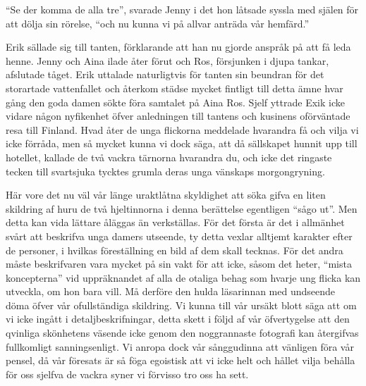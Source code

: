 ``Se der komma de alla tre'', svarade Jenny i det hon låtsade syssla med
själen för att dölja sin rörelse, ``och nu kunna vi på allvar anträda
vår hemfärd.''

Erik sällade sig till tanten, förklarande att han nu gjorde anspråk på
att få leda henne. Jenny och Aina ilade åter förut och Ros, försjunken i
djupa tankar, afslutade tåget. Erik uttalade naturligtvis för tanten sin
beundran för det storartade vattenfallet och återkom städse mycket
fintligt till detta ämne hvar gång den goda damen sökte föra samtalet på
Aina Ros. Sjelf yttrade Exik icke vidare någon nyfikenhet öfver
anledningen till tantens och kusinens oförväntade resa till Finland.
Hvad åter de unga flickorna meddelade hvarandra få och vilja vi icke
förråda, men så mycket kunna vi dock säga, att då sällskapet hunnit upp
till hotellet, kallade de två vackra tärnorna hvarandra du, och icke det
ringaste tecken till svartsjuka tycktes grumla deras unga vänskaps
morgongryning.

Här vore det nu väl vår länge uraktlåtna skyldighet att söka gifva en
liten skildring af huru de två hjeltinnorna i denna berättelse
egentligen ``sågo ut''. Men detta kan vida lättare åläggas än
verkställas. För det första är det i allmänhet svårt att beskrifva unga
damers utseende, ty detta vexlar alltjemt karakter efter de personer, i
hvilkas föreställning en bild af dem skall tecknas. För det andra måste
beskrifvaren vara mycket på sin vakt för att icke, såsom det heter,
``mista koncepterna'' vid uppräknandet af alla de otaliga behag som
hvarje ung flicka kan utveckla, om hon bara vill. Må derföre den hulda
läsarinnan med undseende döma öfver vår ofullständiga skildring. Vi
kunna till vår ursäkt blott säga att om vi icke ingått i
detaljbeskrifningar, detta skett i följd af vår öfvertygelse att den
qvinliga skönhetens väsende icke genom den noggrannaste fotografi kan
återgifvas fullkomligt sanningsenligt. Vi anropa dock vår sånggudinna
att vänligen föra vår pensel, då vår föresats är så föga egoistisk att
vi icke helt och hållet vilja behålla för oss sjelfva de vackra syner vi
förvisso tro oss ha sett.

